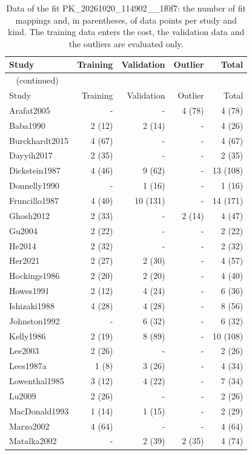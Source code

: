 \documentclass{article}
\begin{document}
\begin{longtable}{lrrrr}
\caption{Data of the fit PK\_20261020\_114902\_\_1f0f7: the number of fit mappings and, in parentheses, of data points per study and kind. The training data enters the cost, the validation data and the outliers are evaluated only.}\label{tab:data:PK_20261020_114902__1f0f7} \\
\toprule
Study & Training & Validation & Outlier & Total \\
\midrule
\endfirsthead
\multicolumn{5}{l}{\small\tablename~\thetable{} (continued)} \\
\toprule
Study & Training & Validation & Outlier & Total \\
\midrule
\endhead
\bottomrule
\endlastfoot
Arafat2005 & - & - & 4 (78) & 4 (78) \\
Baba1990 & 2 (12) & 2 (14) & - & 4 (26) \\
Burckhardt2015 & 4 (67) & - & - & 4 (67) \\
Dayyih2017 & 2 (35) & - & - & 2 (35) \\
Dickstein1987 & 4 (46) & 9 (62) & - & 13 (108) \\
Donnelly1990 & - & 1 (16) & - & 1 (16) \\
Fruncillo1987 & 4 (40) & 10 (131) & - & 14 (171) \\
Ghosh2012 & 2 (33) & - & 2 (14) & 4 (47) \\
Gu2004 & 2 (22) & - & - & 2 (22) \\
He2014 & 2 (32) & - & - & 2 (32) \\
Her2021 & 2 (27) & 2 (30) & - & 4 (57) \\
Hockings1986 & 2 (20) & 2 (20) & - & 4 (40) \\
Howes1991 & 2 (12) & 4 (24) & - & 6 (36) \\
Ishizaki1988 & 4 (28) & 4 (28) & - & 8 (56) \\
Johnston1992 & - & 6 (32) & - & 6 (32) \\
Kelly1986 & 2 (19) & 8 (89) & - & 10 (108) \\
Lee2003 & 2 (26) & - & - & 2 (26) \\
Lees1987a & 1 (8) & 3 (26) & - & 4 (34) \\
Lowenthal1985 & 3 (12) & 4 (22) & - & 7 (34) \\
Lu2009 & 2 (26) & - & - & 2 (26) \\
MacDonald1993 & 1 (14) & 1 (15) & - & 2 (29) \\
Marzo2002 & 4 (64) & - & - & 4 (64) \\
Matalka2002 & - & 2 (39) & 2 (35) & 4 (74) \\

\end{longtable}
\end{document}
